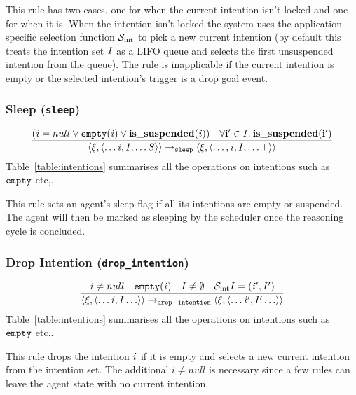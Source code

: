 This rule has two cases, one for when the current intention isn't locked and one for when it is.  When the intention isn't locked the system uses the application specific selection function $\mathcal{S}_{\mathrm{int}}$ to pick a new current intention (by default this treats the intention set $\mathit{I}$ as a LIFO queue and selects the first unsuspended intention from the queue).  The rule is inapplicable if the current intention is empty or the selected intention's trigger is a drop goal event.

\subsubsection*{Sleep ({\tt sleep})}

\begin{equation}
\frac{
 (\mathit{i} = null \vee {\tt empty}(\mathit{i}) \vee \bf is\_suspended(\mathit{i})) \quad
 \forall i' \in \mathit{I}. \: \bf is\_suspended(i')
}{
\langle \xi,  \langle \ldots \mathit{i}, \mathit{I}, \ldots S \rangle \rangle
 \rightarrow_{\tt sleep} \langle \xi, \langle \ldots, \mathit{i}, \mathit{I}, \ldots \top \rangle \rangle
}
\end{equation}
Table~\ref{table:intentions} summarises all the operations on intentions such as ${\tt empty}$ etc,.

This rule sets an agent's sleep flag if all its intentions are empty or suspended.  The agent will then be marked as sleeping by the scheduler once the reasoning cycle is concluded.

\subsubsection*{Drop Intention ({\tt drop\_intention})}
\begin{equation}
\frac{\mathit{i} \neq null \quad {\tt empty}(\mathit{i}) \quad
\mathit{I} \neq \emptyset 
\quad
\mathcal{S}_{\mathrm{int}}{\mathit{I}} = (\mathit{i}', \mathit{I}')
}{\langle \xi, \langle \ldots \mathit{i}, \mathit{I} \ldots \rangle \rangle
\rightarrow_{\tt drop\_intention} \langle \xi, \langle \ldots \mathit{i}', \mathit{I}' \ldots \rangle \rangle}
\end{equation}
Table~\ref{table:intentions} summarises all the operations on intentions such as ${\tt empty}$ etc,.

This rule 
drops the intention $\mathit{i}$ if it is empty and
selects a new current intention from the intention set.  The
additional $i \neq null$ is necessary since a few rules can leave the
agent state with no current intention.

